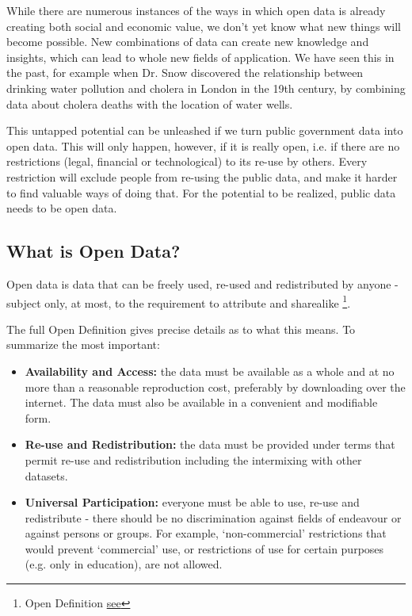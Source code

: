 \documentclass[letterpaper,10pt,oneside]{sphinxmanual}
\begin{document}
While there are numerous instances of the ways in which open data is already creating both social and economic value, we don’t yet know what new things will become possible. New combinations of data can create new knowledge and insights, which can lead to whole new fields of application. We have seen this in the past, for example when Dr. Snow discovered the relationship between drinking water pollution and cholera in London in the 19th century, by combining data about cholera deaths with the location of water wells.

This untapped potential can be unleashed if we turn public government data into open data. This will only happen, however, if it is really open, i.e. if there are no restrictions (legal, financial or technological) to its re-use by others. Every restriction will exclude people from re-using the public data, and make it harder to find valuable ways of doing that. For the potential to be realized, public data needs to be open data.


\subsection{What is Open Data?}
\label{introduction:what-is-open-data}
Open data is data that can be freely used, re-used and redistributed by anyone - subject only, at most, to the requirement to attribute and sharealike \footnote[3]{\sphinxAtStartFootnote%
Open Definition \href{http://opendefinition.org}{see}
}.

The full Open Definition gives precise details as to what this means. To summarize the most important:
\begin{itemize}
\item {} 
\textbf{Availability and Access:} the data must be available as a whole and at no more than a reasonable reproduction cost, preferably by downloading over the internet. The data must also be available in a convenient and modifiable form.

\item {} 
\textbf{Re-use and Redistribution:} the data must be provided under terms that permit re-use and redistribution including the intermixing with other datasets.

\item {} 
\textbf{Universal Participation:} everyone must be able to use, re-use and redistribute - there should be no discrimination against fields of endeavour or against persons or groups. For example, ‘non-commercial’ restrictions that would prevent ‘commercial’ use, or restrictions of use for certain purposes (e.g. only in education), are not allowed.

\end{itemize}
\end{document}
